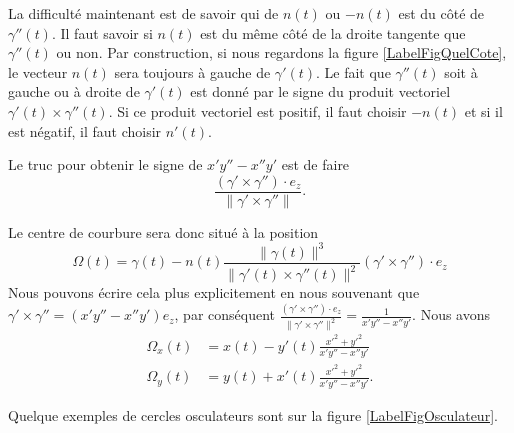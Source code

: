 La difficulté maintenant est de savoir qui de $n(t)$ ou $-n(t)$ est du côté de $\gamma''(t)$. Il faut savoir si $n(t)$ est du même côté de la droite tangente que $\gamma''(t)$ ou non. Par construction, si nous regardons la figure  \ref{LabelFigQuelCote}, le vecteur $n(t)$ sera toujours à gauche de $\gamma'(t)$. Le fait que $\gamma''(t)$ soit à gauche ou à droite de $\gamma'(t)$ est donné par le signe du produit vectoriel $\gamma'(t)\times \gamma''(t)$. Si ce produit vectoriel est positif, il faut choisir $-n(t)$ et si il est négatif, il faut choisir $n'(t)$.

Le truc pour obtenir le signe de $x'y''-x''y'$ est de faire
\begin{equation}
    \frac{ (\gamma'\times\gamma'')\cdot e_z}{\| \gamma'\times\gamma'' \|}.
\end{equation}

Le centre de courbure sera donc situé à la position
\begin{equation}
    \Omega(t)=\gamma(t)-n(t)\frac{ \| \gamma(t) \|^3 }{ \| \gamma'(t)\times\gamma''(t) \|^2 } (\gamma'\times\gamma'')\cdot e_z
\end{equation}
Nous pouvons écrire cela plus explicitement en nous souvenant que $\gamma'\times\gamma''=(x'y''-x''y')e_z$, par conséquent $\frac{ (\gamma'\times\gamma'')\cdot e_z}{\| \gamma'\times\gamma'' \|^2}=\frac{1}{ x'y''-x''y' }$. Nous avons
\begin{subequations}
    \begin{align}
        \Omega_x(t)&=x(t)-y'(t)\frac{ x'^2+y'^2 }{ x'y''-x''y' }\\
        \Omega_y(t)&=y(t)+x'(t)\frac{ x'^2+y'^2 }{ x'y''-x''y' }.
    \end{align}
\end{subequations}

Quelque exemples de cercles osculateurs sont sur la figure \ref{LabelFigOsculateur}.
\newcommand{\CaptionFigOsculateur}{Exemple de cercles osculateurs.}


